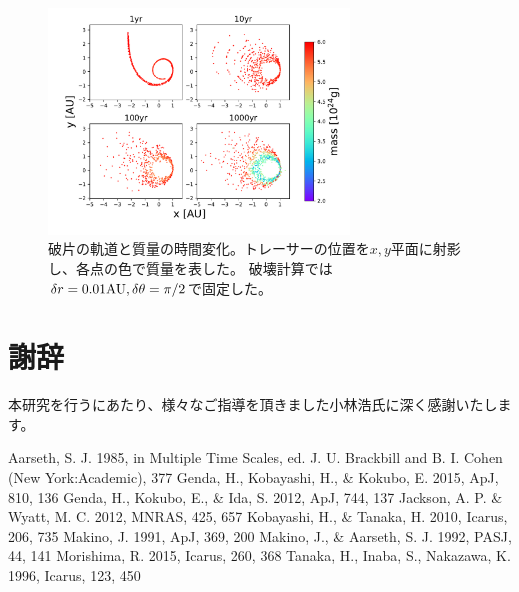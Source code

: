 \documentclass[a4paper,10pt,oneside,twocolumn,notitlepage,final]{jarticle}
\begin{document}
\begin{figure}[h]
 \centering
 \includegraphics[width=8cm]{L2cone30equidistant_v1011curl_OnlyPlanet_1000yr.pdf}
 \caption{破片の軌道と質量の時間変化。トレーサーの位置を$x,y$平面に射影し、各点の色で質量を表した。
 破壊計算では$\delta r = 0.01 {\rm AU}, \delta \theta = \pi/2$で固定した。\label{fig:L2cone}}
\end{figure}









\section*{謝辞}
本研究を行うにあたり、様々なご指導を頂きました小林浩氏に深く感謝いたします。

\small
\begin{thebibliography}{99}
 Aarseth, S. J. 1985, in Multiple Time Scales, ed. J. U. Brackbill and B. I. Cohen (New York:Academic), 377
 Genda, H., Kobayashi, H., \& Kokubo, E. 2015, ApJ, 810, 136 
 Genda, H., Kokubo, E., \& Ida, S. 2012, ApJ, 744, 137
 Jackson, A. P. \& Wyatt, M. C. 2012, MNRAS, 425, 657
 Kobayashi, H., \& Tanaka, H. 2010, Icarus, 206, 735
 Makino, J. 1991, ApJ, 369, 200
 Makino, J., \& Aarseth, S. J. 1992, PASJ, 44, 141
 Morishima, R. 2015, Icarus, 260, 368
 Tanaka, H., Inaba, S., Nakazawa, K. 1996, Icarus, 123, 450
 
\end{thebibliography}
\end{document}
